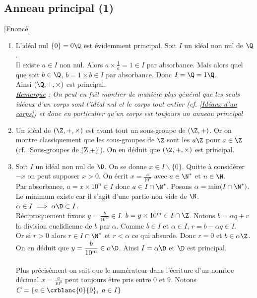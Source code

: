 \documentclass[8pt]{book}
\begin{document}
	\subsection{Anneau principal (1)}
	\label{Anneau principal (1) corrigé}
	\textcolor{blue}{\hyperref[Anneau principal (1)]{[Enoncé]}}\\
	\begin{enumerate}[leftmargin=*]
		\item L'idéal nul $\{0\}=0\Q$ est évidemment principal. Soit $I$ un idéal non nul de $\Q$.\\
		Il existe $a\in I$ non nul. Alors $a\times\displaystyle\frac{1}{a}=1\in I$ par absorbance. Mais alors quel que soit $b\in \Q$, $b=1\times b\in I$ par absorbance. Donc $I=\Q=1\Q$.\\
		Ainsi $(\Q,+,\times)$ est principal.\\
		\textit{\underline{Remarque} : On peut en fait montrer de manière plus général que les seuls idéaux d'un corps sont l'idéal nul et le corps tout entier (cf. \ref{Idéaux d'un corps}) et donc en particulier qu'un corps est toujours un anneau principal}
		\item Un idéal de $(\Z,+,\times)$ est avant tout un sous-groupe de $(\Z,+)$. Or on montre classiquement que les sous-groupes de $\Z$ sont les $a\Z$ pour $a\in \Z$ (cf. \ref{Sous-groupes de (Z,+)}). On en déduit que $(\Z,+,\times)$ est principal.
		\item Soit $I$ un idéal non nul de $\D$. On se donne $x\in I\backslash\{0\}$. Quitte à considérer $-x$ on peut supposer $x>0$. On écrit $x=\displaystyle\frac{a}{10^n}$ avec $a\in \N^*$ et $n\in \N$.\\
		Par absorbance, $a=x\times 10^n\in I$ donc $a\in I\cap\N^*$. Posons $\alpha=\min(I\cap \N^*)$. Le minimum existe car il s'agit d'une partie non vide de $\N$. $\alpha\in I\implies \alpha\D\subset I$.\\
		Réciproquement fixons $y=\displaystyle\frac{b}{10^m}\in I$. $b=y\times 10^m\in I\cap \Z$. Notons $b=\alpha q+r$ la division euclidienne de $b$ par $\alpha$. Comme $b\in I$ et $\alpha\in I$, $r=b-\alpha q\in I$.\\
		Or si $r>0$ alors $r\in I\cap\N^*$ et $r<\alpha$ ce qui absurde. Donc $r=0$ et $b\in \alpha\Z$.\\
		On en déduit que $y=\displaystyle\frac{b}{10^m}\in \alpha\D$. Ainsi $I=\alpha\D$ et $\D$ est principal.\\\\
		Plus précisément on sait que le numérateur dans l'écriture d'un nombre décimal $x=\displaystyle\frac{a}{10^n}$ peut toujours être pris entre $0$ et $9$. Notons $C=\{a\in \crblanc{0}{9},\ a\in I\}$

\end{enumerate}
\end{document}
